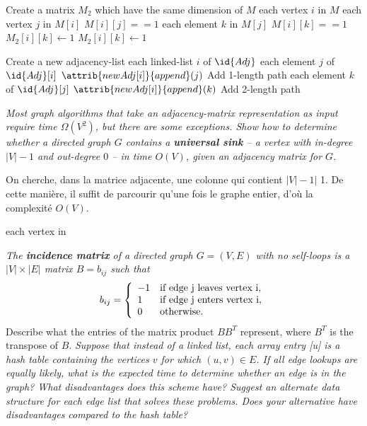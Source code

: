 \begin{description}
\begin{ex}
\begin{codebox}
\li Create a matrix $M_2$ which have the same dimension of $M$
\li \For each vertex $i$ in $M$ \Do
  \li \For each vertex $j$ in $M[i]$ \Do
    \li \If $M[i][j]==1$ \Then
      \li \For each element $k$ in $M[j]$ \Do
        \li \If $M[i][k] == 1$ \Then
          \li $M_2[i][k] \gets 1$ 
        \End
        \li $M_2[i][k] \gets 1$ 
      \End 
    \End 
  \End
\End
\end{codebox}
\begin{codebox}
\li Create a new adjacency-list 
\li \For each linked-list $i$ of $\id{Adj}$ \Do 
    \li \For each element $j$ of $\id{Adj}[i]$ \Do
        \li $\attrib{newAdj[i]}{append}(j)$ \Comment Add 1-length path
        \li \For each element $k$ of $\id{Adj}[j]$ \Do
            \li $\attrib{newAdj[i]}{append}(k)$ \Comment Add 2-length path
        \End
    \End
\end{codebox}
\end{ex}
 \textit{Most graph algorithms that take an adjacency-matrix representation as input require time $\Omega(V^2)$, but there are some exceptions. Show how to determine whether a directed graph $G$ contains a \textbf{universal sink} -- a vertex with in-degree $|V| - 1$ and out-degree $0$ -- in time $O(V)$, given an adjacency matrix for $G$.}    

\begin{exrev}
On cherche, dans la matrice adjacente, une colonne qui contient $|V|-1|$ 1. De cette manière, il suffit de parcourir qu'une fois le graphe entier, d'où la complexité $O(V)$.

\begin{codebox}
\li \For each vertex in 
\end{codebox}
\end{exrev}
 \textit{The \textbf{incidence matrix} of a directed graph $G = (V,E)$ with no self-loops is a $|V| \times |E|$ matrix $B = b_{ij}$ such that}
\[
    b_{ij} = \left\{
    \begin{array}{ll}
        -1 & \text{if edge }$j$\text{ leaves vertex } $i$,\\
        1 & \text{if edge }$j$\text{ enters vertex } $i$,\\
        0 & \text{otherwise.}
    \end{array}
    \right.
\]
Describe what the entries of the matrix product $BB^T$ represent, where $B^T$ is the transpose of $B$.
 \textit{Suppose that instead of a linked list, each array entry [u] is a hash table containing the vertices $v$ for which $(u,v) \in E$. If all edge lookups are equally likely, what is the expected time to determine whether an edge is in the graph? What disadvantages does this scheme have? Suggest an alternate data structure for each edge list that solves these problems. Does your alternative have disadvantages compared to
the hash table?}    
\begin{exrev}


\end{exrev}
\end{description}
